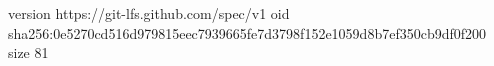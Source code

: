 version https://git-lfs.github.com/spec/v1
oid sha256:0e5270cd516d979815eec7939665fe7d3798f152e1059d8b7ef350cb9df0f200
size 81
